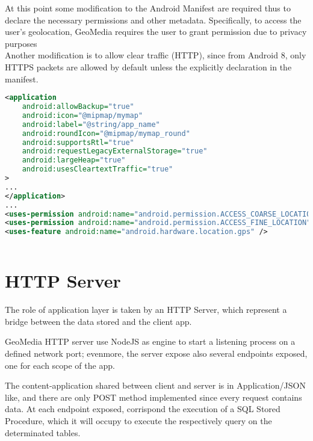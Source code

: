 \documentclass[conference]{IEEEtran}
\begin{document}
At this point some modification to the Android Manifest are required thus to declare the necessary permissions and other metadata.
Specifically, to access the user's geolocation, GeoMedia requires the user to grant permission due to privacy purposes
\\
Another modification is to allow clear traffic (HTTP), since from Android 8, only HTTPS packets are allowed by default unless the explicitly declaration in the manifest.

\begin{lstlisting}[language=XML, caption=Snippet of Android Manifest]
<application
    android:allowBackup="true"
    android:icon="@mipmap/mymap"
    android:label="@string/app_name"
    android:roundIcon="@mipmap/mymap_round"
    android:supportsRtl="true"
    android:requestLegacyExternalStorage="true"
    android:largeHeap="true"
    android:usesCleartextTraffic="true"
>
...
</application>
...
<uses-permission android:name="android.permission.ACCESS_COARSE_LOCATION" />
<uses-permission android:name="android.permission.ACCESS_FINE_LOCATION" />
<uses-feature android:name="android.hardware.location.gps" />
        
\end{lstlisting}

\section{HTTP Server}

The role of application layer is taken by an HTTP Server, which represent a bridge between the data stored and the client app.

GeoMedia HTTP server use NodeJS as engine to start a listening process on a defined network port; evenmore, the server expose also several endpoints exposed, one for each scope of the app.

The content-application shared between client and server is in Application/JSON like, and there are only POST method implemented since every request contains data.
At each endpoint exposed, corrispond the execution of a SQL Stored Procedure, which it will occupy to execute the respectively query on the determinated tables.
\end{document}

